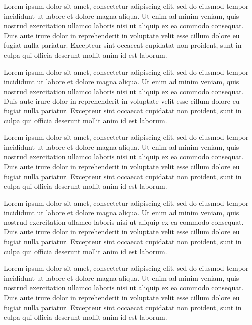\documentclass{book}
\begin{document}
Lorem ipsum dolor sit amet, consectetur adipiscing elit, sed do eiusmod tempor incididunt ut labore et dolore magna aliqua. Ut enim ad minim veniam, quis nostrud
exercitation ullamco laboris nisi ut aliquip ex ea commodo consequat. Duis aute irure dolor in reprehenderit in voluptate velit esse cillum dolore eu fugiat nulla pariatur. Excepteur sint occaecat cupidatat non proident, sunt in culpa qui officia deserunt mollit anim id est laborum.

Lorem ipsum dolor sit amet, consectetur adipiscing elit, sed do eiusmod tempor incididunt ut labore et dolore magna aliqua. Ut enim ad minim veniam, quis nostrud
exercitation ullamco laboris nisi ut aliquip ex ea commodo consequat. Duis aute irure dolor in reprehenderit in voluptate velit esse cillum dolore eu fugiat nulla pariatur. Excepteur sint occaecat cupidatat non proident, sunt in culpa qui officia deserunt mollit anim id est laborum.
 
Lorem ipsum dolor sit amet, consectetur adipiscing elit, sed do eiusmod tempor incididunt ut labore et dolore magna aliqua. Ut enim ad minim veniam, quis nostrud
exercitation ullamco laboris nisi ut aliquip ex ea commodo consequat. Duis aute irure dolor in reprehenderit in voluptate velit esse cillum dolore eu fugiat nulla pariatur. Excepteur sint occaecat cupidatat non proident, sunt in culpa qui officia deserunt mollit anim id est laborum.
 
Lorem ipsum dolor sit amet, consectetur adipiscing elit, sed do eiusmod tempor incididunt ut labore et dolore magna aliqua. Ut enim ad minim veniam, quis nostrud
exercitation ullamco laboris nisi ut aliquip ex ea commodo consequat. Duis aute irure dolor in reprehenderit in voluptate velit esse cillum dolore eu fugiat nulla pariatur. Excepteur sint occaecat cupidatat non proident, sunt in culpa qui officia deserunt mollit anim id est laborum.
 
Lorem ipsum dolor sit amet, consectetur adipiscing elit, sed do eiusmod tempor incididunt ut labore et dolore magna aliqua. Ut enim ad minim veniam, quis nostrud
exercitation ullamco laboris nisi ut aliquip ex ea commodo consequat. Duis aute irure dolor in reprehenderit in voluptate velit esse cillum dolore eu fugiat nulla pariatur. Excepteur sint occaecat cupidatat non proident, sunt in culpa qui officia deserunt mollit anim id est laborum.
\end{document}
